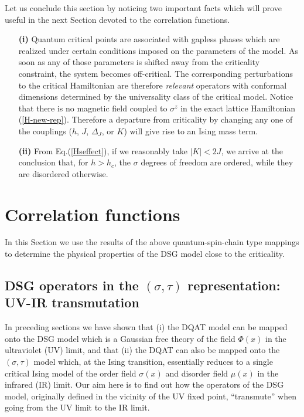Let us conclude this section by noticing two
important facts which will prove useful
in the next Section devoted to the correlation functions.
\begin{itemize}
\item[{\bf (i)}]
Quantum critical points are associated with gapless phases which are
realized under certain conditions imposed on the parameters of
the model. As soon as any of those parameters
is shifted away from the criticality constraint,
the system becomes off-critical. The corresponding perturbations
to the critical Hamiltonian are therefore
{\sl relevant} operators with conformal dimensions
determined by the universality class of the critical model.
Notice that there is no magnetic field coupled to $\sigma^z$ in the exact
lattice Hamiltonian (\ref{H-new-rep}). Therefore a departure from
criticality by changing any one of the couplings ($h$, $J$,
$\Delta_J$,
or $K$) will give rise to an Ising mass term.

\item[{\bf (ii)}]
From Eq.(\ref{Hseffect}), if we reasonably take $|K|<2J$, we arrive at
the conclusion that, for $h>h_c$, the $\sigma$ degrees of freedom
are ordered, while they are disordered otherwise.
\end{itemize}

\section{Correlation functions}
\label{corf}

In this Section we use the results of the above
quantum-spin-chain type mappings to determine the
physical properties of the DSG model close to
the criticality.

\subsection{DSG operators in  the $(\sigma,\tau)$ representation: UV-IR transmutation}

In preceding sections we have shown that (i) the DQAT
model can be mapped onto the DSG model which is a Gaussian
free theory of the field $\Phi(x)$ in the ultraviolet
(UV) limit, and that (ii) the DQAT can also be
mapped onto the $(\sigma,\tau)$ model which, at the Ising
transition,
essentially reduces to a single critical Ising model
of the order field $\sigma(x)$ and disorder field
$\mu(x)$
in the infrared (IR) limit. Our aim here is to find out
how the operators of the DSG model, originally defined in the
vicinity of the UV fixed point, ``transmute'' when going from the
UV limit to the IR limit.

